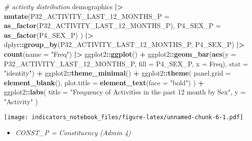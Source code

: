\documentclass[
]{article}
\newenvironment{Shaded}{\begin{snugshade}}{\end{snugshade}}
\newcommand{\AttributeTok}[1]{\textcolor[rgb]{0.13,0.29,0.53}{#1}}
\newcommand{\CommentTok}[1]{\textcolor[rgb]{0.56,0.35,0.01}{\textit{#1}}}
\newcommand{\FunctionTok}[1]{\textcolor[rgb]{0.13,0.29,0.53}{\textbf{#1}}}
\newcommand{\NormalTok}[1]{#1}
\newcommand{\SpecialCharTok}[1]{\textcolor[rgb]{0.81,0.36,0.00}{\textbf{#1}}}
\newcommand{\StringTok}[1]{\textcolor[rgb]{0.31,0.60,0.02}{#1}}
\providecommand{\tightlist}{%
  \setlength{\itemsep}{0pt}\setlength{\parskip}{0pt}}
\begin{document}
\begin{Shaded}
\begin{Highlighting}[]
\CommentTok{\# activity distribution}
\NormalTok{demographics }\SpecialCharTok{|\textgreater{}}
  \FunctionTok{mutate}\NormalTok{(}\AttributeTok{P32\_ACTIVITY\_LAST\_12\_MONTHS\_P =} \FunctionTok{as\_factor}\NormalTok{(P32\_ACTIVITY\_LAST\_12\_MONTHS\_P),}
         \AttributeTok{P4\_SEX\_P =} \FunctionTok{as\_factor}\NormalTok{(P4\_SEX\_P)}
\NormalTok{         ) }\SpecialCharTok{|\textgreater{}}
\NormalTok{  dplyr}\SpecialCharTok{::}\FunctionTok{group\_by}\NormalTok{(P32\_ACTIVITY\_LAST\_12\_MONTHS\_P, P4\_SEX\_P) }\SpecialCharTok{|\textgreater{}}
  \FunctionTok{count}\NormalTok{(}\AttributeTok{name =} \StringTok{"Freq"}\NormalTok{) }\SpecialCharTok{|\textgreater{}}
\NormalTok{  ggplot2}\SpecialCharTok{::}\FunctionTok{ggplot}\NormalTok{() }\SpecialCharTok{+}
\NormalTok{  ggplot2}\SpecialCharTok{::}\FunctionTok{geom\_bar}\NormalTok{(}\FunctionTok{aes}\NormalTok{(}\AttributeTok{y =}\NormalTok{ P32\_ACTIVITY\_LAST\_12\_MONTHS\_P, }
                        \AttributeTok{fill =}\NormalTok{ P4\_SEX\_P, }
                        \AttributeTok{x =}\NormalTok{ Freq), }
                    \AttributeTok{stat =} \StringTok{"identity"}\NormalTok{) }\SpecialCharTok{+}
\NormalTok{  ggplot2}\SpecialCharTok{::}\FunctionTok{theme\_minimal}\NormalTok{() }\SpecialCharTok{+}
\NormalTok{  ggplot2}\SpecialCharTok{::}\FunctionTok{theme}\NormalTok{(}
    \AttributeTok{panel.grid =} \FunctionTok{element\_blank}\NormalTok{(),}
    \AttributeTok{plot.title =} \FunctionTok{element\_text}\NormalTok{(}\AttributeTok{face =} \StringTok{"bold"}\NormalTok{)}
\NormalTok{  ) }\SpecialCharTok{+}
\NormalTok{  ggplot2}\SpecialCharTok{::}\FunctionTok{labs}\NormalTok{(}
    \AttributeTok{title =} \StringTok{"Frequency of Activities in the past 12 month by Sex"}\NormalTok{,}
    \AttributeTok{y =} \StringTok{"Activity"}
\NormalTok{  )}
\end{Highlighting}
\end{Shaded}

\texttt{[image: indicators\_notebook\_files/figure-latex/unnamed-chunk-6-1.pdf]}

\begin{itemize}
\tightlist
\item
  \emph{CONST\_P = Constituency (Admin 4)}
\end{itemize}
\end{document}
